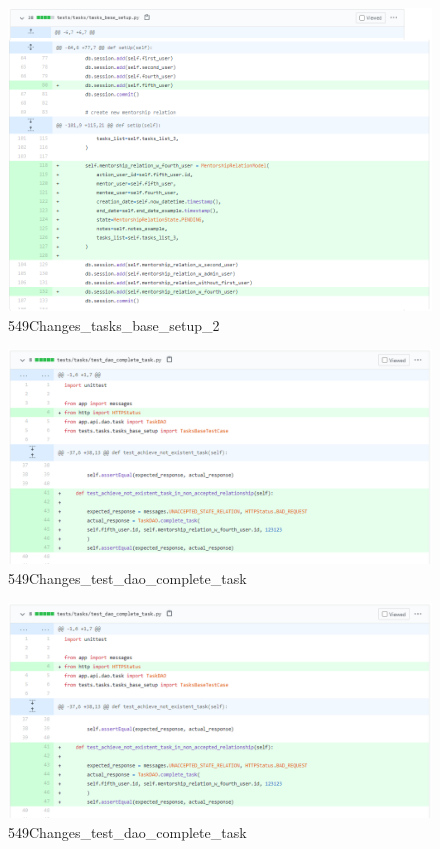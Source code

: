 \documentclass{article}
\begin{document}
\begin{figure}[tph!]
\centerline{\includegraphics[totalheight=15cm, width=16cm]{549Changes_tasks_base_setup_2.png}}
    \caption{549Changes\_tasks\_base\_setup\_2}
    \label{fig:verticalcell}
\end{figure}
\begin{figure}[tph!]
\centerline{\includegraphics[totalheight=15cm, width=16cm]{549Changes_test_dao_complete_task.png}}
    \caption{549Changes\_test\_dao\_complete\_task}
    \label{fig:verticalcell}
\end{figure}
\begin{figure}[tph!]
\centerline{\includegraphics[totalheight=15cm, width=16cm]{549Changes_test_dao_complete_task.png}}
    \caption{549Changes\_test\_dao\_complete\_task}
    \label{fig:verticalcell}
\end{figure}
\end{document}
